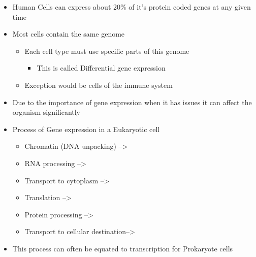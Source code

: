 \documentclass[letterpaper]{article}
\begin{document}
\begin{itemize}
\item Human Cells can express about 20\% of it's protein coded genes at any
given time
\item Most cells contain the same genome

\begin{itemize}
\item Each cell type must use specific parts of this genome

\begin{itemize}
\item This is called Differential gene expression
\end{itemize}

\item Exception would be cells of the immune system
\end{itemize}

\item Due to the importance of gene expression when it has issues it can
affect the organism significantly
\item Process of Gene expression in a Eukaryotic cell

\begin{itemize}
\item Chromatin (DNA unpacking) -->
\item RNA processing -->
\item Transport to cytoplasm -->
\item Translation -->
\item Protein processing -->
\item Transport to cellular destination-->
\end{itemize}

\item This process can often be equated to transcription for Prokaryote
cells
\end{itemize}
\end{document}
